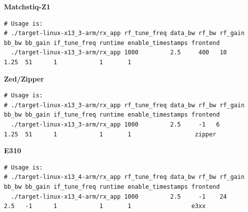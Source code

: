 \noindent\textbf{Matchstiq-Z1}\\
\scriptsize
\noindent
\begin{verbatim}
# Usage is:
# ./target-linux-x13_3-arm/rx_app rf_tune_freq data_bw rf_bw rf_gain bb_bw bb_gain if_tune_freq runtime enable_timestamps frontend
  ./target-linux-x13_3-arm/rx_app 1000         2.5     400   10      1.25  51      1            1       1
\end{verbatim}
\par\medskip

\normalsize
\noindent\textbf{Zed/Zipper}\\
\scriptsize
\noindent
\begin{verbatim}
# Usage is:
# ./target-linux-x13_3-arm/rx_app rf_tune_freq data_bw rf_bw rf_gain bb_bw bb_gain if_tune_freq runtime enable_timestamps frontend
  ./target-linux-x13_3-arm/rx_app 1000         2.5     -1   6      1.25  51      1            1       1                  zipper
\end{verbatim}
\par\medskip


\normalsize
\noindent\textbf{E310}\\
\scriptsize
\noindent
\begin{verbatim}
# Usage is:
# ./target-linux-x13_4-arm/rx_app rf_tune_freq data_bw rf_bw rf_gain bb_bw bb_gain if_tune_freq runtime enable_timestamps frontend
  ./target-linux-x13_4-arm/rx_app 1000         2.5     -1    24      2.5   -1      1            1       1                 e3xx
\end{verbatim}
\par\medskip


